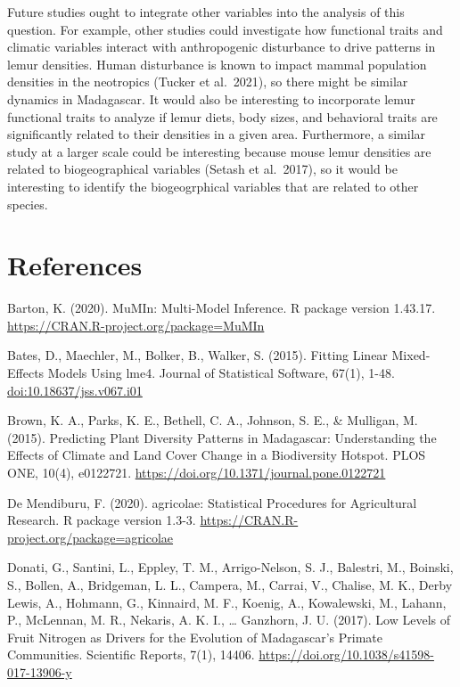 \documentclass[
  12pt,
]{article}
\begin{document}
Future studies ought to integrate other variables into the analysis of
this question. For example, other studies could investigate how
functional traits and climatic variables interact with anthropogenic
disturbance to drive patterns in lemur densities. Human disturbance is
known to impact mammal population densities in the neotropics (Tucker et
al.~2021), so there might be similar dynamics in Madagascar. It would
also be interesting to incorporate lemur functional traits to analyze if
lemur diets, body sizes, and behavioral traits are significantly related
to their densities in a given area. Furthermore, a similar study at a
larger scale could be interesting because mouse lemur densities are
related to biogeographical variables (Setash et al.~2017), so it would
be interesting to identify the biogeogrphical variables that are related
to other species. \newpage

\hypertarget{references}{%
\section{References}\label{references}}

Barton, K. (2020). MuMIn: Multi-Model Inference. R package version
1.43.17. \url{https://CRAN.R-project.org/package=MuMIn}

Bates, D., Maechler, M., Bolker, B., Walker, S. (2015). Fitting Linear
Mixed-Effects Models Using lme4. Journal of Statistical Software, 67(1),
1-48. \url{doi:10.18637/jss.v067.i01}

Brown, K. A., Parks, K. E., Bethell, C. A., Johnson, S. E., \& Mulligan,
M. (2015). Predicting Plant Diversity Patterns in Madagascar:
Understanding the Effects of Climate and Land Cover Change in a
Biodiversity Hotspot. PLOS ONE, 10(4), e0122721.
\url{https://doi.org/10.1371/journal.pone.0122721}

De Mendiburu, F. (2020). agricolae: Statistical Procedures for
Agricultural Research. R package version 1.3-3.
\url{https://CRAN.R-project.org/package=agricolae}

Donati, G., Santini, L., Eppley, T. M., Arrigo-Nelson, S. J., Balestri,
M., Boinski, S., Bollen, A., Bridgeman, L. L., Campera, M., Carrai, V.,
Chalise, M. K., Derby Lewis, A., Hohmann, G., Kinnaird, M. F., Koenig,
A., Kowalewski, M., Lahann, P., McLennan, M. R., Nekaris, A. K. I.,
\ldots{} Ganzhorn, J. U. (2017). Low Levels of Fruit Nitrogen as Drivers
for the Evolution of Madagascar's Primate Communities. Scientific
Reports, 7(1), 14406. \url{https://doi.org/10.1038/s41598-017-13906-y}
\end{document}
